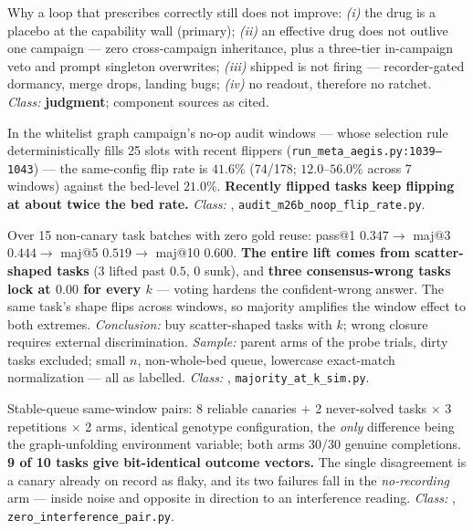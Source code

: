 \begin{description}[leftmargin=0pt,style=nextline,font=\normalfont,itemsep=6pt]
\item[\textbf{F40}\quad Four layers of mortality.]
Why a loop that prescribes correctly still does not improve:
\emph{(i)} the drug is a placebo at the capability wall (primary);
\emph{(ii)} an effective drug does not outlive one campaign --- zero
cross-campaign inheritance, plus a three-tier in-campaign veto and prompt
singleton overwrites; \emph{(iii)} shipped is not firing --- recorder-gated
dormancy, merge drops, landing bugs; \emph{(iv)} no readout, therefore no
ratchet. \emph{Class:} \textbf{ judgment}; component sources as
cited.

\item[\textbf{F41}\quad Volatile-family persistence --- the noise is not
      uniform.]
In the whitelist graph campaign's no-op audit windows --- whose selection
rule deterministically fills 25 slots with recent flippers
(\texttt{run\_meta\_aegis.py:1039--1043}) --- the same-config flip rate is
\textbf{$41.6\%$} (74/178; $12.0$--$56.0\%$ across 7 windows) against the
bed-level $21.0\%$. \textbf{Recently flipped tasks keep flipping at about
twice the bed rate.} \emph{Class:} ,
\texttt{audit\_m26b\_noop\_flip\_rate.py}.

\item[\textbf{F42}\quad Offline majority-at-$k$ simulation.]
Over 15 non-canary task batches with zero gold reuse: pass@1 $0.347 \to$
maj@3 $0.444 \to$ maj@5 $0.519 \to$ maj@10 $0.600$. \textbf{The entire
lift comes from scatter-shaped tasks} (3 lifted past $0.5$, 0 sunk), and
\textbf{three consensus-wrong tasks lock at $0.00$ for every $k$} ---
voting hardens the confident-wrong answer. The same task's shape flips
across windows, so majority amplifies the window effect to both extremes.
\emph{Conclusion:} buy scatter-shaped tasks with $k$; wrong closure
requires external discrimination. \emph{Sample:} parent arms of the probe
trials, dirty tasks excluded; small $n$, non-whole-bed queue,
lowercase exact-match normalization --- all as labelled.
\emph{Class:} , \texttt{majority\_at\_k\_sim.py}.

\item[\textbf{F43}\quad Zero-interference replay.]
Stable-queue same-window pairs: 8 reliable canaries $+$ 2 never-solved
tasks $\times$ 3 repetitions $\times$ 2 arms, identical genotype
configuration, the \emph{only} difference being the graph-unfolding
environment variable; both arms 30/30 genuine completions.
\textbf{9 of 10 tasks give bit-identical outcome vectors.} The single
disagreement is a canary already on record as flaky, and its two failures
fall in the \emph{no-recording} arm --- inside noise and opposite in
direction to an interference reading. \emph{Class:} ,
\texttt{zero\_interference\_pair.py}.


\end{description}
